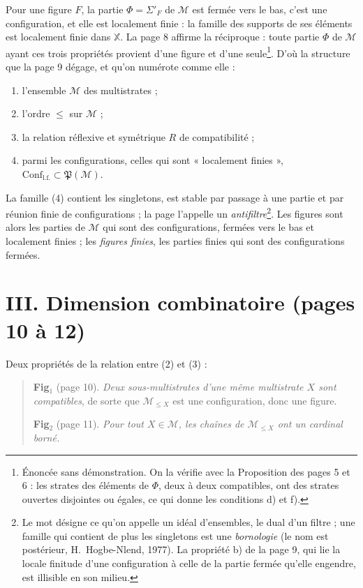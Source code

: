 \documentclass[11pt,a4paper]{article}
\begin{document}
Pour une figure $F$, la partie $\Phi = \Sigma'_{F}$ de $\mathcal{M}$ est
fermée vers le bas, c'est une configuration, et elle est localement finie : la
famille des supports de ses éléments est localement finie dans $\mathbb{X}$.
La page 8 affirme la réciproque : toute partie $\Phi$ de $\mathcal{M}$ ayant
ces trois propriétés provient d'une figure et d'une seule\footnote{Énoncée sans
démonstration. On la vérifie avec la Proposition des pages 5 et 6 : les strates
des éléments de $\Phi$, deux à deux compatibles, ont des strates ouvertes
disjointes ou égales, ce qui donne les conditions d) et f).}. D'où la
structure que la page 9 dégage, et qu'on numérote comme elle :
\begin{enumerate}
\item[(1)] l'ensemble $\mathcal{M}$ des multistrates ;
\item[(2)] l'ordre $\leq$ sur $\mathcal{M}$ ;
\item[(3)] la relation réflexive et symétrique $R$ de compatibilité ;
\item[(4)] parmi les configurations, celles qui sont « localement finies »,
$\mathrm{Conf}_{\mathrm{l.f.}} \subset \mathfrak{P}(\mathcal{M})$.
\end{enumerate}
La famille (4) contient les singletons, est stable par passage à une partie et
par réunion finie de configurations ; la page l'appelle un
\emph{antifiltre}\footnote{Le mot désigne ce qu'on appelle un idéal
d'ensembles, le dual d'un filtre ; une famille qui contient de plus les
singletons est une \emph{bornologie} (le nom est postérieur, H.~Hogbe-Nlend,
1977). La propriété b) de la page 9, qui lie la locale finitude d'une
configuration à celle de la partie fermée qu'elle engendre, est illisible en
son milieu.}. Les figures sont alors les parties de $\mathcal{M}$ qui sont des
configurations, fermées vers le bas et localement finies ; les \emph{figures
finies}, les parties finies qui sont des configurations fermées.

\section*{III. Dimension combinatoire (pages 10 à 12)}

Deux propriétés de la relation entre (2) et (3) :

\begin{quote}
\textbf{Fig}$_{1}$ (page 10). \emph{Deux sous-multistrates d'une même
multistrate $X$ sont compatibles}, de sorte que $\mathcal{M}_{\leq X}$ est une
configuration, donc une figure.

\textbf{Fig}$_{2}$ (page 11). \emph{Pour tout $X \in \mathcal{M}$, les chaînes
de $\mathcal{M}_{\leq X}$ ont un cardinal borné.}
\end{quote}
\end{document}
